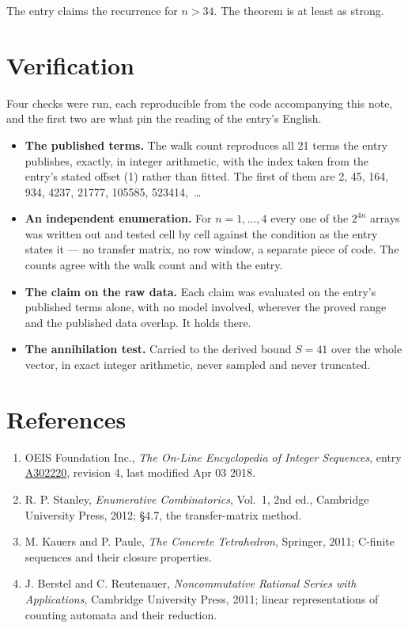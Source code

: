 \documentclass[11pt]{article}
\theoremstyle{definition}
\begin{document}
The entry claims the recurrence for $n > 34$. The theorem is at least as strong.

\section{Verification}

Four checks were run, each reproducible from the code accompanying this note, and the first two are what pin the reading of the entry's English.

\begin{itemize}

\item {\bfseries The published terms.} The walk count reproduces all 21 terms the entry publishes, exactly, in integer arithmetic, with the index taken from the entry's stated offset (1) rather than fitted. The first of them are 2, 45, 164, 934, 4237, 21777, 105585, 523414,~\dots

\item {\bfseries An independent enumeration.} For $n = 1,\dots,4$ every one of the $2^{4n}$ arrays was written out and tested cell by cell against the condition as the entry states it --- no transfer matrix, no row window, a separate piece of code. The counts agree with the walk count and with the entry.

\item {\bfseries The claim on the raw data.} Each claim was evaluated on the entry's published terms alone, with no model involved, wherever the proved range and the published data overlap. It holds there.

\item {\bfseries The annihilation test.} Carried to the derived bound $S = 41$ over the whole vector, in exact integer arithmetic, never sampled and never truncated.

\end{itemize}

\section{References}

\begin{enumerate}

\item OEIS Foundation Inc., \emph{The On-Line Encyclopedia of Integer Sequences}, entry \href{https://oeis.org/A302220}{A302220}, revision 4, last modified Apr 03 2018.

\item R. P. Stanley, \emph{Enumerative Combinatorics}, Vol.~1, 2nd ed., Cambridge University Press, 2012; \S4.7, the transfer-matrix method.

\item M. Kauers and P. Paule, \emph{The Concrete Tetrahedron}, Springer, 2011; C-finite sequences and their closure properties.

\item J. Berstel and C. Reutenauer, \emph{Noncommutative Rational Series with Applications}, Cambridge University Press, 2011; linear representations of counting automata and their reduction.

\end{enumerate}
\end{document}
